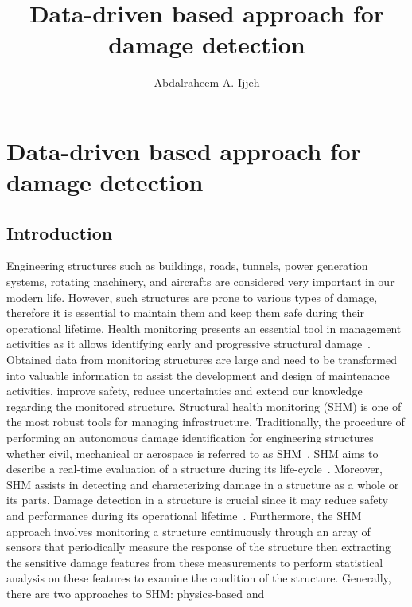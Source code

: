 \documentclass[b5paper, 11pt, openany, titlepage]{book}
\begin{document}


\title{Data-driven based approach for damage detection}
\author{Abdalraheem A. Ijjeh}
\maketitle
\tableofcontents
\chapter[Data-driven approach]{Data-driven based approach for damage detection}
\section{Introduction}
Engineering structures such as buildings, roads, tunnels, power generation systems, rotating machinery, and aircrafts are considered very important in our modern life.
However, such structures are prone to various types of damage, therefore it is essential to maintain them and keep them safe during their operational lifetime.
Health monitoring presents an essential tool in management activities as it allows identifying early and progressive structural damage~\cite{farrar2007introduction}. 
Obtained data from monitoring structures are large and need to be transformed into valuable information to assist the development and design of maintenance activities, improve safety, reduce uncertainties and extend our knowledge regarding the monitored structure.
Structural health monitoring (SHM) is one of the most robust
tools for managing infrastructure.
Traditionally, the procedure of performing an autonomous damage identification for engineering structures whether civil, mechanical or aerospace is referred to as SHM~\cite{farrar2001vibration}.
SHM aims to describe a real-time evaluation of a structure during its life-cycle~\cite{Balageas2010}. 
Moreover, SHM assists in detecting and characterizing damage in a structure as a whole or its parts. 
Damage detection in a structure is crucial since it may reduce safety and performance during its operational lifetime~\cite{Yuan2016}.
Furthermore, the SHM approach involves monitoring a structure continuously through an array of sensors that periodically measure the response of the structure then extracting the sensitive damage features from these measurements to perform statistical analysis on these features to examine the condition of the structure.
Generally, there are two approaches to SHM: physics-based and
\end{document}
